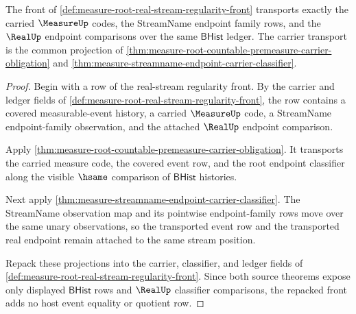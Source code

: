 \begin{theorem}
\label{thm:measure-root-real-stream-carrier-regularity}
The front of \autoref{def:measure-root-real-stream-regularity-front}
transports exactly the carried $\MeasureUp$ codes, the StreamName endpoint
family rows, and the $\RealUp$ endpoint comparisons over the same
$\mathsf{BHist}$ ledger. The carrier transport is the common projection of
\autoref{thm:measure-root-countable-premeasure-carrier-obligation} and
\autoref{thm:measure-streamname-endpoint-carrier-classifier}.
\end{theorem}
\begin{proof}
Begin with a row of the real-stream regularity front. By the carrier and
ledger fields of \autoref{def:measure-root-real-stream-regularity-front}, the
row contains a covered measurable-event history, a carried $\MeasureUp$ code,
a StreamName endpoint-family observation, and the attached $\RealUp$ endpoint
comparison.

Apply
\autoref{thm:measure-root-countable-premeasure-carrier-obligation}. It
transports the carried measure code, the covered event row, and the root
endpoint classifier along the visible $\hsame$ comparison of
$\mathsf{BHist}$ histories.

Next apply
\autoref{thm:measure-streamname-endpoint-carrier-classifier}. The StreamName
observation map and its pointwise endpoint-family rows move over the same
unary observations, so the transported event row and the transported real
endpoint remain attached to the same stream position.

Repack these projections into the carrier, classifier, and ledger fields of
\autoref{def:measure-root-real-stream-regularity-front}. Since both source
theorems expose only displayed $\mathsf{BHist}$ rows and $\RealUp$ classifier
comparisons, the repacked front adds no host event equality or quotient row.
\end{proof}


